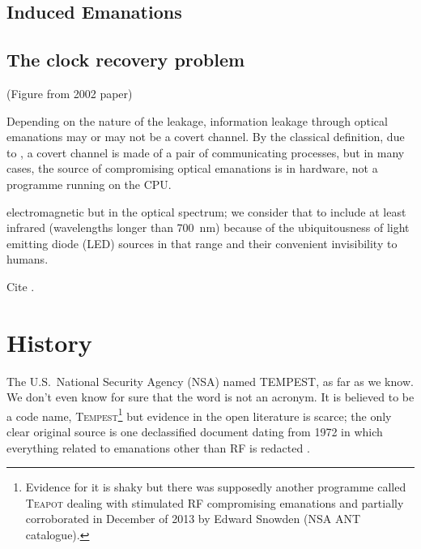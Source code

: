 \documentclass[a4paper,twoside,11pt]{book}
\begin{document}
\subsection{Induced Emanations}

\label{section:injection_attacks}

\subsection{The clock recovery problem}

(Figure from 2002 paper)

Depending on the nature of the leakage, information leakage through optical
emanations may or may not be a covert channel. By the classical definition,
due to \cite{Lampson1973}, a covert channel is made of a pair of communicating
processes, but in many cases, the source of compromising optical emanations
is in hardware, not a programme running on the CPU.

electromagnetic but in the optical spectrum; we consider that to include at
least infrared (wavelengths longer than \SI{700}{\nano\metre}) because of the
ubiquitousness of light emitting diode (LED) sources in that range and their
convenient invisibility to humans.

Cite \cite{Allain2019}.

\section{History}
The U.S.\ National Security Agency (NSA) named TEMPEST, as far as we know. We
don't even know for sure that the word is not an acronym. It is believed to
be a code name, \textsc{Tempest}\footnote{Evidence for it is shaky but there
was supposedly another programme called \textsc{Teapot} dealing with
stimulated RF compromising emanations \cite[p.~539]{Anderson2008a} and
partially corroborated in December of 2013 by Edward Snowden (NSA ANT
catalogue).} but evidence in the open literature is scarce; the only clear
original source is one declassified document dating from 1972 in which
everything related to emanations other than RF is redacted
\cite{NSAtempest2007}.
\end{document}
